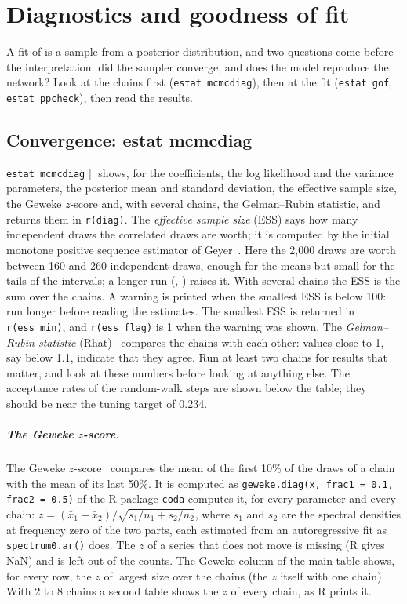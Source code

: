 \chapter{Diagnostics and goodness of fit}\label{ch:diagnostics}

A fit of \nwlsm{} is a sample from a posterior distribution, and two questions come before the interpretation: did the sampler converge, and does the model reproduce the network? Look at the chains first (\texttt{estat mcmcdiag}), then at the fit (\texttt{estat gof}, \texttt{estat ppcheck}), then read the results.

\section{Convergence: estat mcmcdiag}

\texttt{estat mcmcdiag} [] shows, for the coefficients, the log likelihood and the variance parameters, the posterior mean and standard deviation, the effective sample size, the Geweke $z$-score and, with several chains, the Gelman--Rubin statistic, and returns them in \texttt{r(diag)}.
The \emph{effective sample size} (ESS) says how many independent draws the correlated draws are worth; it is computed by the initial monotone positive sequence estimator of Geyer~\cite{geyer1992}. Here the 2,000 draws are worth between 160 and 260 independent draws, enough for the means but small for the tails of the intervals; a longer run (, ) raises it. With several chains the ESS is the sum over the chains. A warning is printed when the smallest ESS is below 100: run longer before reading the estimates. The smallest ESS is returned in \texttt{r(ess\_min)}, and \texttt{r(ess\_flag)} is 1 when the warning was shown. The \emph{Gelman--Rubin statistic} (Rhat)~\cite{gelman1992} compares the chains with each other: values close to 1, say below 1.1, indicate that they agree. Run at least two chains for results that matter, and look at these numbers before looking at anything else. The acceptance rates of the random-walk steps are shown below the table; they should be near the tuning target of 0.234.

\paragraph{The Geweke $z$-score.} The Geweke $z$-score~\cite{geweke1992} compares the mean of the first 10\% of the draws of a chain with the mean of its last 50\%. It is computed as \texttt{geweke.diag(x, frac1 = 0.1, frac2 = 0.5)} of the R package \texttt{coda} computes it, for every parameter and every chain: $z=(\bar x_1-\bar x_2)/\sqrt{s_1/n_1+s_2/n_2}$, where $s_1$ and $s_2$ are the spectral densities at frequency zero of the two parts, each estimated from an autoregressive fit as \texttt{spectrum0.ar()} does. The $z$ of a series that does not move is missing (R gives NaN) and is left out of the counts. The Geweke column of the main table shows, for every row, the $z$ of largest size over the chains (the $z$ itself with one chain). With 2 to 8 chains a second table shows the $z$ of every chain, as R prints it.

